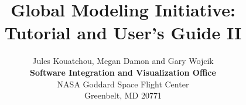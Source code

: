 \documentclass[11pt,twoside]{report}
\begin{document}
\thispagestyle{empty}			%

\title{\Huge \bf Global Modeling Initiative: \\ Tutorial and User's Guide II}
\author{{\sc Jules Kouatchou, Megan Damon and Gary Wojcik} \\
{\Large\bf Software Integration and Visualization Office} \\
NASA Goddard Space Flight Center \\
Greenbelt, MD 20771}
\maketitle

\newtheorem{remark}{Remark}
\newtheorem{example}{Example}
\newtheorem{definition}{Definition}
\newtheorem{conjecture}{Conjecture}
\newtheorem{theorem}{Theorem}
\newtheorem{Corollary}{Corollary}



%

\tableofcontents
\listoftables
\listoffigures















\appendix







\end{document}
